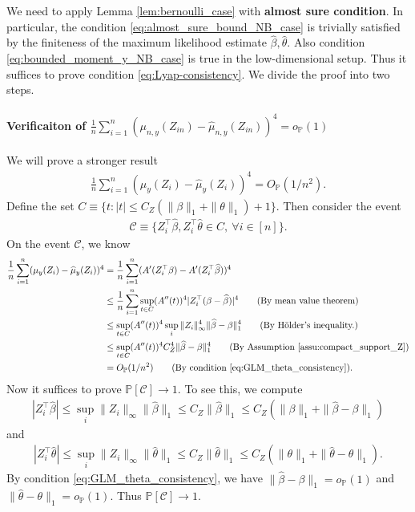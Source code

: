 \documentclass[12pt]{article}
\theoremstyle{definition}
\def\P{\mathbb{P}}
\def\P{\mathbb{P}}
\renewcommand{\P}{\mathbb{P}}							%
\newcommand{\srz}{Z}									%
\begin{document}
We need to apply Lemma \ref{lem:bernoulli_case} with \textbf{almost sure condition}. In particular, the condition \eqref{eq:almost_sure_bound_NB_case} is trivially satisfied by the finiteness of the maximum likelihood estimate $\widehat{\beta},\widehat{\theta}$. Also condition \eqref{eq:bounded_moment_y_NB_case} is true in the low-dimensional setup. Thus it suffices to prove condition \eqref{eq:Lyap-consistency}. We divide the proof into two steps.

\paragraph{Verificaiton of $\frac{1}{n}\sum_{i=1}^n (\mu_{n,y}(\srz_{in})-\widehat{\mu}_{n,y}(\srz_{in}))^{4}=o_{\P}(1)$}

We will prove a stronger result
\begin{align}\label{eq:GLM_L4_convergence}
  \frac{1}{n}\sum_{i=1}^n (\mu_y(\srz_i)-\widehat{\mu}_y(\srz_i))^4=O_\P(1/n^2).
\end{align}
Define the set $C\equiv \{t:|t|\leq C_Z(\|\beta\|_1+\|\theta\|_1)+1\}$. Then consider the event 
\begin{align*}
  \mathcal{C}\equiv \{\srz_i^\top\widehat{\beta},\srz_i^\top\widehat{\theta}\in C,\ \forall i\in[n]\}.
\end{align*}
On the event $\mathcal{C}$, we know 
\begin{align*}
  \frac{1}{n}\sum_{i=1}^n (\mu_y(\srz_i)-\widehat{\mu}_y(\srz_i))^4
  &
  =\frac{1}{n}\sum_{i=1}^n (A'(\srz_i^\top \beta)-A'(\srz_i^\top\widehat{\beta}))^4\\
  &
  \leq \frac{1}{n}\sum_{i=1}^n\sup_{t\in C}(A''(t))^4|\srz_i^\top(\beta-\widehat\beta)|^4\tag{By mean value theorem}\\
  &
  \leq \sup_{t\in C}(A''(t))^4\sup_i\|\srz_i\|_{\infty}^4\|\widehat{\beta}-\beta\|_1^4\tag{By H\"older's inequality.}\\
  &
  \leq \sup_{t\in C}(A''(t))^4C_Z^4\|\widehat{\beta}-\beta\|_1^4\tag{By Assumption \ref{assu:compact_support_Z}}\\
  &
  =O_\P(1/n^2)\tag{By condition \eqref{eq:GLM_theta_consistency}}.
\end{align*}
Now it suffices to prove $\P[\mathcal{C}]\rightarrow1$. To see this, we compute 
\begin{align*}
  |\srz_i^\top \widehat{\beta}|\leq \sup_i\|\srz_i\|_{\infty}\|\widehat{\beta}\|_1\leq C_Z\|\widehat{\beta}\|_1\leq C_Z(\|\beta\|_1+\|\widehat{\beta}-\beta\|_1)
\end{align*}
and 
\begin{align*}
  |\srz_i^\top \widehat{\theta}|\leq \sup_i\|\srz_i\|_{\infty}\|\widehat{\theta}\|_1\leq C_Z\|\widehat{\theta}\|_1\leq C_Z(\|\theta\|_1+\|\widehat{\theta}-\theta\|_1).
\end{align*}
By condition \eqref{eq:GLM_theta_consistency}, we have $\|\widehat{\beta}-\beta\|_1=o_\P(1)$ and $\|\widehat{\theta}-\theta\|_1=o_\P(1)$. Thus $\P[\mathcal{C}]\rightarrow1$.
\end{document}

